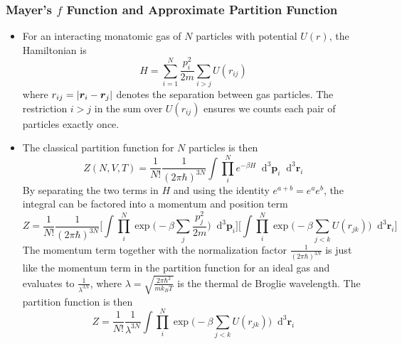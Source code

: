 \documentclass[11pt, a4paper]{article}
\newcommand{\diff}{\mathop{}\!\mathrm{d}} %
\begin{document}
\subsubsection{Mayer's $ f $ Function and Approximate Partition Function}
\begin{itemize}
	\item For an interacting monatomic gas of $ N $ particles with potential $ U(r) $, the Hamiltonian is
	\begin{equation*}
		H = \sum_{i=1}^{N} \frac{p_{i}^{2}}{2m} \sum_{i>j}U(r_{ij})
	\end{equation*}
	where $ r_{ij} = \abs{\bm{r}_{i} - \bm{r}_{j}}$ denotes the separation between gas particles. The restriction $ i > j $ in the sum over $ U(r_{ij}) $ ensures we counts each pair of particles exactly once.
	
	\item The classical partition function for $ N $ particles is then
	\begin{equation*}
		Z(N, V, T) = \frac{1}{N!}\frac{1}{(2\pi \hbar)^{3N}} \int \prod_{i}^{N}e^{-\beta H} \diff^{3} \bm{p}_{i} \diff^{3} \bm{r}_{i} 
	\end{equation*}
	By separating the two terms in $ H $ and using the identity $ e^{a + b} = e^{a}e^{b} $, the integral can be factored into a momentum and position term
	\begin{equation*}
		\textstyle{Z = \frac{1}{N!}\frac{1}{(2\pi \hbar)^{3N}} \Big[\int \prod_{i}^{N} \exp \Big(-\beta \sum_{j} \frac{p_{j}^{2}}{2m}\Big) \diff^{3} \bm{p}_{i}\Big] \Big[\int \prod_{i}^{N}\exp\Big(-\beta \sum_{j < k}U(r_{jk})\Big) \diff^{3} \bm{r}_{i} \Big]}
	\end{equation*}
	The momentum term together with the normalization factor $ \frac{1}{(2\pi \hbar)^{3N}} $ is just like the momentum term in the partition function for an ideal gas and evaluates to $ \frac{1}{\lambda^{3N}} $, where $ \lambda = \sqrt{\frac{2\pi \hbar^{2}}{mk_{B}T}} $ is the thermal de Broglie wavelength. The partition function is then
	\begin{equation*}
		Z = \frac{1}{N!}\frac{1}{\lambda^{3N}} \int \prod_{i}^{N}\exp \bigg (-\beta \sum_{j < k}U(r_{jk})\bigg ) \diff^{3} \bm{r}_{i} 
	\end{equation*}
	

\end{itemize}
\end{document}
